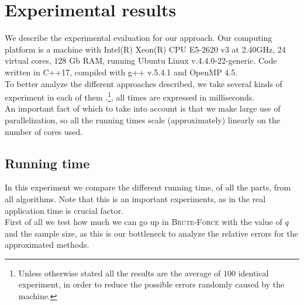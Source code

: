     \section{Experimental results}

    We describe the experimental evaluation for our approach. Our computing platform is a machine with Intel(R) Xeon(R) CPU E5-2620 v3 at 2.40GHz, 24 virtual cores, 128 Gb RAM, running Ubuntu Linux v.4.4.0-22-generic. Code written in C++17, compiled with g++ v.5.4.1 and OpenMP 4.5.\\
    
    To better analyze the different approaches described, we take several kinds of experiment in each of them .\footnote{Unless otherwise stated all the results are the average of $100$ identical experiment, in order to reduce the possible errors randomly caused by the machine.}, all times are expressed in milliseconds.\\
     
    An important fact of which to take into account is that we make large use of parallelization, 
    so all the running times scale (approximately) linearly on the number of cores used.
    
	\subsection*{Running time}
	
	In this experiment we compare the different running time, of all the parts, from all algorithms. Note that this is an important experiments, as in the real application time is crucial factor.\\

	First of all we test how much we can go up in \textsc{Brute-Force} with the value of $q$ and the sample size, as this is our bottleneck to analyze the relative errors for the approximated methods.\\ 
	
